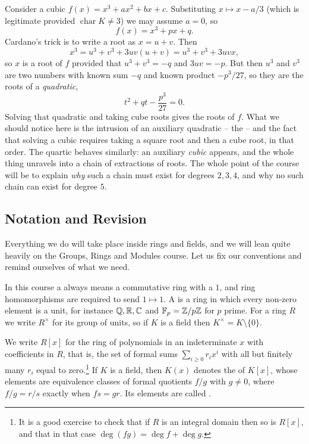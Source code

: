 \documentclass[a4paper]{scrartcl}
\newcommand{\charr}{\operatorname{char}}
\begin{document}
Consider a cubic $f(x) = x^3 + ax^2 + bx + c$. Substituting $x \mapsto x - a/3$ (which is legitimate provided $\charr K \neq 3$) we may assume $a = 0$, so
$$f(x) = x^3 + px + q.$$
Cardano's trick is to write a root as $x = u + v$. Then
$$x^3 = u^3 + v^3 + 3uv(u+v) = u^3 + v^3 + 3uvx,$$
so $x$ is a root of $f$ provided that $u^3 + v^3 = -q$ and $3uv = -p$. But then $u^3$ and $v^3$ are two numbers with known sum $-q$ and known product $-p^3/27$, so they are the roots of a \emph{quadratic},
$$t^2 + qt - \frac{p^3}{27} = 0.$$
Solving that quadratic and taking cube roots gives the roots of $f$. What we should notice here is the intrusion of an auxiliary quadratic -- the  -- and the fact that solving a cubic requires taking a square root and then a cube root, in that order. The quartic behaves similarly: an auxiliary \emph{cubic} appears, and the whole thing unravels into a chain of extractions of roots. The whole point of the course will be to explain \emph{why} such a chain must exist for degrees $2, 3, 4$, and why no such chain can exist for degree $5$.

\subsection{Notation and Revision}

Everything we do will take place inside rings and fields, and we will lean quite heavily on the Groups, Rings and Modules course. Let us fix our conventions and remind ourselves of what we need.

In this course a  always means a commutative ring with a $1$, and ring homomorphisms are required to send $1 \mapsto 1$. A  is a ring in which every non-zero element is a unit, for instance $\mathbb{Q}, \mathbb{R}, \mathbb{C}$ and $\mathbb{F}_p = \mathbb{Z}/p\mathbb{Z}$ for $p$ prime. For a ring $R$ we write $R^\times$ for its group of units, so if $K$ is a field then $K^\times = K \setminus \{0\}$.

We write $R[x]$ for the ring of polynomials in an indeterminate $x$ with coefficients in $R$, that is, the set of formal sums $\sum_{i \geq 0} r_i x^i$ with all but finitely many $r_i$ equal to zero.\footnote{It is a good exercise to check that if $R$ is an integral domain then so is $R[x]$, and that in that case $\deg(fg) = \deg f + \deg g$.} If $K$ is a field, then $K(x)$ denotes the  of $K[x]$, whose elements are equivalence classes of formal quotients $f/g$ with $g \neq 0$, where $f/g = r/s$ exactly when $fs = gr$. Its elements are called .
\end{document}
